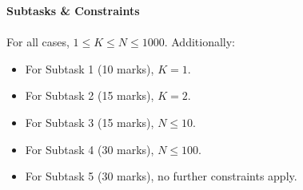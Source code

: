 \documentclass{article}
\begin{document}
\textbf{Subtasks \& Constraints} \\
\ \\
For all cases, $1 \leq K \leq N \leq 1000$. Additionally:
\begin{itemize}
	\item For Subtask 1 (10 marks), $K = 1$.
	\item For Subtask 2 (15 marks), $K = 2$.
	\item For Subtask 3 (15 marks), $N \leq 10$.
	\item For Subtask 4 (30 marks), $N \leq 100$.
	\item For Subtask 5 (30 marks), no further constraints apply.
\end{itemize}
	
\end{document}
